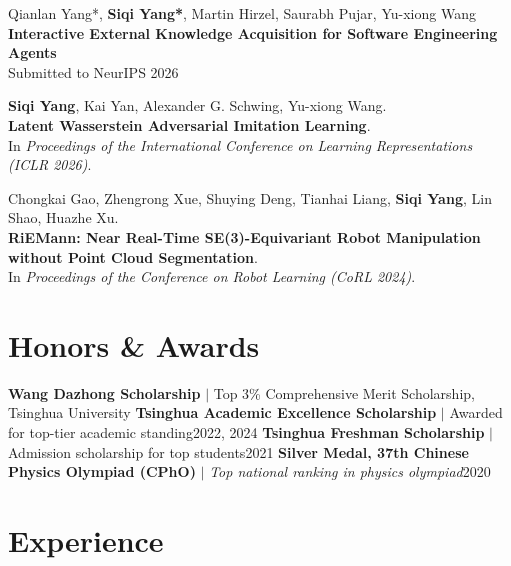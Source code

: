 \vspace{2mm}

Qianlan Yang*, \textbf{Siqi Yang*}, Martin Hirzel, Saurabh Pujar, Yu-xiong Wang \\
\textbf{Interactive External Knowledge Acquisition for Software Engineering Agents}\\
Submitted to NeurIPS 2026 \\

\vspace{2mm}

\textbf{Siqi Yang}, Kai Yan, Alexander G. Schwing, Yu-xiong Wang. \\  
\textbf{Latent Wasserstein Adversarial Imitation Learning}.  \\
In \textit{Proceedings of the International Conference on Learning Representations (ICLR 2026)}. 

\vspace{2mm}

Chongkai Gao, Zhengrong Xue, Shuying Deng, Tianhai Liang, \textbf{Siqi Yang}, Lin Shao, Huazhe Xu.  \\
\textbf{RiEMann: Near Real-Time SE(3)-Equivariant Robot Manipulation without Point Cloud Segmentation}.  \\
In \textit{Proceedings of the Conference on Robot Learning (CoRL 2024)}.

\section{\textbf{Honors \& Awards}}
  \resumeSubHeadingListStart
    \resumeProjectHeading
      {\textbf{Wang Dazhong Scholarship} $|$ \footnotesize{Top 3\% Comprehensive Merit Scholarship, Tsinghua University}}{}
    \resumeProjectHeading
      {\textbf{Tsinghua Academic Excellence Scholarship} $|$ \footnotesize{Awarded for top-tier academic standing}}{2022, 2024}
    \resumeProjectHeading
      {\textbf{Tsinghua Freshman Scholarship} $|$ \footnotesize{Admission scholarship for top students}}{2021}
    \resumeProjectHeading
      {\textbf{Silver Medal, 37th Chinese Physics Olympiad (CPhO)} $|$ \textit{Top national ranking in physics olympiad}}{2020}
  \resumeSubHeadingListEnd

\section{\textbf{Experience}}
\vspace{-0.2mm}

